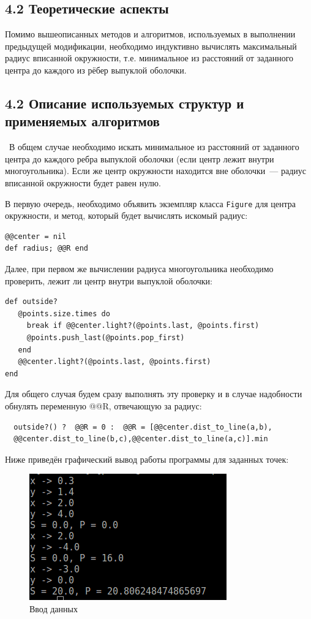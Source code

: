 \subsection*{4.2 Теоретические аспекты}

Помимо вышеописанных методов и алгоритмов, используемых в выполнении
 предыдущей модификации, необходимо индуктивно
 вычислять максимальный радиус вписанной окружности, т.е. минимальное из  расстояний
  от заданного центра до каждого из рёбер выпуклой оболочки.


\subsection*{4.2 Описание используемых структур и применяемых алгоритмов}\
В общем случае необходимо искать минимальное из расстояний
от заданного центра до каждого ребра выпуклой оболочки (если центр лежит внутри многоугольника).
Если же центр окружности находится вне оболочки~--- радиус вписанной окружности будет равен нулю.



 В первую очередь, необходимо  объявить экземпляр класса \verb|Figure| для центра окружности,
  и метод, который будет вычислять искомый радиус:
\begin{lstlisting}
@@center = nil
def radius; @@R end
\end{lstlisting}

Далее, при первом же вычислении радиуса многоугольника необходимо проверить, лежит ли центр
 внутри выпуклой оболочки:

\begin{lstlisting}
def outside?
   @points.size.times do
     break if @@center.light?(@points.last, @points.first)
     @points.push_last(@points.pop_first)
   end
   @@center.light?(@points.last, @points.first)
end
\end{lstlisting}

Для общего случая будем сразу выполнять эту проверку и в случае надобности   обнулять переменную  @@R, отвечающую за радиус:
\begin{lstlisting}
  outside?() ?  @@R = 0 :  @@R = [@@center.dist_to_line(a,b),
  @@center.dist_to_line(b,c),@@center.dist_to_line(a,c)].min

\end{lstlisting}

Ниже приведён графический вывод работы программы для заданных точек:
\begin{figure}[ht!]
\begin{center}
\includegraphics[width=0.5\hsize]{images/poly}
\end{center}
\caption{Ввод данных}\label{fig:poly}
\end{figure}

